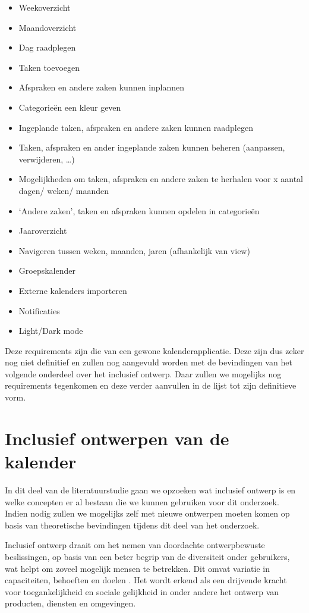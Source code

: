 \begin{itemize}
    
    \item	Weekoverzicht
    \item	Maandoverzicht
    \item	Dag raadplegen
    \item	Taken toevoegen
    \item	Afspraken en andere zaken kunnen inplannen
    \item	Categorieën een kleur geven
    \item	Ingeplande taken, afspraken en andere zaken kunnen raadplegen
    \item	Taken, afspraken en ander ingeplande zaken kunnen beheren (aanpassen, verwijderen, …)
    \item	Mogelijkheden om taken, afspraken en andere zaken te herhalen voor x aantal dagen/ weken/ maanden
    \item	‘Andere zaken’, taken en afspraken kunnen opdelen in categorieën
    \item	Jaaroverzicht
    \item	Navigeren tussen weken, maanden, jaren (afhankelijk van view)
    \item	Groepskalender
    \item	Externe kalenders importeren
    \item	Notificaties
    \item	Light/Dark mode
    
\end{itemize}

Deze requirements zijn die van een gewone kalenderapplicatie. Deze zijn dus zeker nog niet definitief en zullen nog aangevuld worden met de bevindingen van het volgende onderdeel over het inclusief ontwerp. Daar zullen we mogelijks nog requirements tegenkomen en deze verder aanvullen in de lijst tot zijn definitieve vorm.

\section{Inclusief ontwerpen van de kalender}
In dit deel van de literatuurstudie gaan we opzoeken wat inclusief ontwerp is en welke concepten er al bestaan die we kunnen gebruiken voor dit onderzoek. Indien nodig zullen we mogelijks zelf met nieuwe ontwerpen moeten komen op basis van theoretische bevindingen tijdens dit deel van het onderzoek. \newline

Inclusief ontwerp draait om het nemen van doordachte ontwerpbewuste beslissingen, op basis van een beter begrip van de diversiteit onder gebruikers, wat helpt om zoveel mogelijk mensen te betrekken. Dit omvat variatie in capaciteiten, behoeften en doelen \autocite{clarkson2013inclusive}. Het wordt erkend als een drijvende kracht voor toegankelijkheid en sociale gelijkheid in onder andere het ontwerp van producten, diensten en omgevingen. \newline

